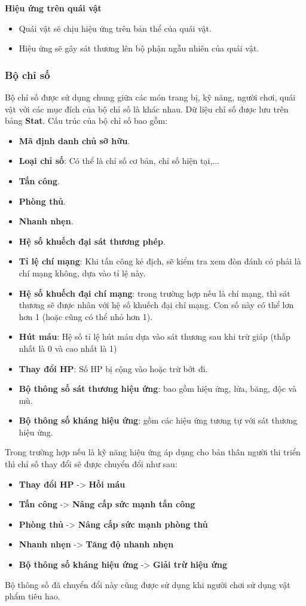 \textbf{Hiệu ứng trên quái vật}
\begin{itemize}
	\item Quái vật sẽ chịu hiệu ứng trên bản thể của quái vật.
	\item Hiệu ứng sẽ gây sát thương lên bộ phận ngẫu nhiên của quái vật.
\end{itemize}
\subsubsection{Bộ chỉ số}
\hspace*{0.5cm} Bộ chỉ số được sử dụng chung giữa các món trang bị, kỹ năng, người chơi, quái vật với các mục đích của bộ chỉ số là khác nhau. Dữ liệu chỉ số được lưu trên bảng \textbf{Stat}. Cấu trúc của bộ chỉ số bao gồm:
\begin{itemize}
	\item \textbf{Mã định danh chủ sỡ hữu}.
	\item \textbf{Loại chỉ số}: Có thể là chỉ số cơ bản, chỉ số hiện tại,... 
	\item \textbf{Tấn công}.
	\item \textbf{Phòng thủ}.
	\item \textbf{Nhanh nhẹn}.
	\item \textbf{Hệ số khuếch đại sát thương phép}.
	\item \textbf{Tỉ lệ chí mạng}: Khi tấn công kẻ địch, sẽ kiểm tra xem đòn đánh có phải là chí mạng không, dựa vào tỉ lệ này.
	\item \textbf{Hệ số khuếch đại chí mạng}: trong trường hợp nếu là chí mạng, thì sát thương sẽ được nhân với hệ số khuếch đại chí mạng. Con số này có thể lơn hơn 1 (hoặc cũng có thể nhỏ hơn 1).
	\item \textbf{Hút máu}: Hệ số tỉ lệ hút máu dựa vào sát thương sau khi trừ giáp (thấp nhất là 0 và cao nhất là 1)
	\item \textbf{Thay đổi HP}: Số HP bị cộng vào hoặc trừ bớt đi.
	\item \textbf{Bộ thông số sát thương hiệu ứng}: bao gồm hiệu ứng, lửa, băng, độc và mù.
	\item \textbf{Bộ thông số kháng hiệu ứng}: gồm các hiệu ứng tương tự với sát thương hiệu ứng.
\end{itemize}
\hspace*{0.5cm} Trong trường hợp nếu là kỹ năng hiệu ứng áp dụng cho bản thân người thi triển thì chỉ số thay đổi sẽ được chuyển đổi như sau:
\begin{itemize}
	\item \textbf{Thay đổi HP} -> \textbf{Hồi máu}
	\item \textbf{Tấn công} -> \textbf{Nâng cấp sức mạnh tấn công}
	\item \textbf{Phòng thủ} -> \textbf{Nâng cấp sức mạnh phòng thủ}
	\item \textbf{Nhanh nhẹn} -> \textbf{Tăng độ nhanh nhẹn}
	\item \textbf{Bộ thông số kháng hiệu ứng} -> \textbf{Giải trừ hiệu ứng}
\end{itemize}
\hspace*{0.5cm} Bộ thông số đã chuyển đổi này cũng được sử dụng khi người chơi sử dụng vật phẩm tiêu hao.

